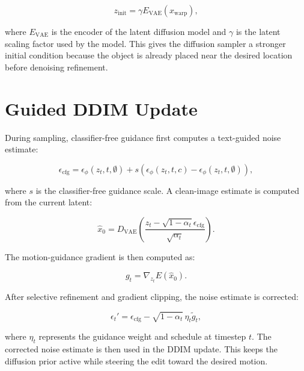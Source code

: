 \begin{equation}
z_{\mathrm{init}}=\gamma E_{\mathrm{VAE}}(x_{\mathrm{warp}}),
\label{eq:latent-init}
\end{equation}

where $E_{\mathrm{VAE}}$ is the encoder of the latent diffusion model and $\gamma$ is the latent scaling factor used by the model. This gives the diffusion sampler a stronger initial condition because the object is already placed near the desired location before denoising refinement.

\section{Guided DDIM Update}

During sampling, classifier-free guidance first computes a text-guided noise estimate:

\begin{equation}
\epsilon_{\mathrm{cfg}}=
\epsilon_\phi(z_t,t,\emptyset)+
s\left(\epsilon_\phi(z_t,t,c)-\epsilon_\phi(z_t,t,\emptyset)\right),
\label{eq:cfg}
\end{equation}

where $s$ is the classifier-free guidance scale. A clean-image estimate is computed from the current latent:

\begin{equation}
\hat{x}_0 = D_{\mathrm{VAE}}
\left(
\frac{z_t-\sqrt{1-\alpha_t}\epsilon_{\mathrm{cfg}}}{\sqrt{\alpha_t}}
\right).
\label{eq:x0-estimate}
\end{equation}

The motion-guidance gradient is then computed as:

\begin{equation}
g_t = \nabla_{z_t}E(\hat{x}_0).
\label{eq:guidance-grad}
\end{equation}

After selective refinement and gradient clipping, the noise estimate is corrected:

\begin{equation}
\epsilon_t' = \epsilon_{\mathrm{cfg}}-\sqrt{1-\alpha_t}\,\eta_t \tilde{g}_t,
\label{eq:noise-correction}
\end{equation}

where $\eta_t$ represents the guidance weight and schedule at timestep $t$. The corrected noise estimate is then used in the DDIM update. This keeps the diffusion prior active while steering the edit toward the desired motion.

